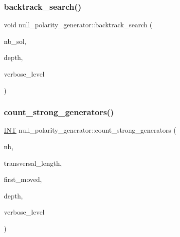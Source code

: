 \subsubsection{\texorpdfstring{backtrack\+\_\+search()}{backtrack\_search()}}
{\footnotesize\ttfamily void null\+\_\+polarity\+\_\+generator\+::backtrack\+\_\+search (\begin{DoxyParamCaption}\item[{\mbox{\hyperlink{galois_8h_a09fddde158a3a20bd2dcadb609de11dc}{I\+NT}} \&}]{nb\+\_\+sol,  }\item[{\mbox{\hyperlink{galois_8h_a09fddde158a3a20bd2dcadb609de11dc}{I\+NT}}}]{depth,  }\item[{\mbox{\hyperlink{galois_8h_a09fddde158a3a20bd2dcadb609de11dc}{I\+NT}}}]{verbose\+\_\+level }\end{DoxyParamCaption})}

\mbox{\label{classnull__polarity__generator_a20fe959b6b3327157126eb4468bf028b}} 
\subsubsection{\texorpdfstring{count\+\_\+strong\+\_\+generators()}{count\_strong\_generators()}}
{\footnotesize\ttfamily \mbox{\hyperlink{galois_8h_a09fddde158a3a20bd2dcadb609de11dc}{I\+NT}} null\+\_\+polarity\+\_\+generator\+::count\+\_\+strong\+\_\+generators (\begin{DoxyParamCaption}\item[{\mbox{\hyperlink{galois_8h_a09fddde158a3a20bd2dcadb609de11dc}{I\+NT}} \&}]{nb,  }\item[{\mbox{\hyperlink{galois_8h_a09fddde158a3a20bd2dcadb609de11dc}{I\+NT}} $\ast$}]{transversal\+\_\+length,  }\item[{\mbox{\hyperlink{galois_8h_a09fddde158a3a20bd2dcadb609de11dc}{I\+NT}} \&}]{first\+\_\+moved,  }\item[{\mbox{\hyperlink{galois_8h_a09fddde158a3a20bd2dcadb609de11dc}{I\+NT}}}]{depth,  }\item[{\mbox{\hyperlink{galois_8h_a09fddde158a3a20bd2dcadb609de11dc}{I\+NT}}}]{verbose\+\_\+level }\end{DoxyParamCaption})}

